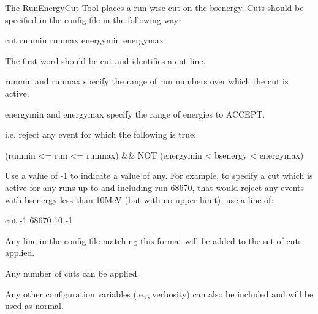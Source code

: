 The Run\+Energy\+Cut Tool places a run-\/wise cut on the bsenergy. Cuts should be specified in the config file in the following way\+: \begin{DoxyVerb}cut runmin runmax energymin energymax
\end{DoxyVerb}

\begin{DoxyItemize}
\item The first word should be \textquotesingle{}cut\textquotesingle{} and identifies a cut line.
\item runmin and runmax specify the range of run numbers over which the cut is active.
\item energymin and energymax specify the range of energies to ACCEPT.
\end{DoxyItemize}

i.\+e. reject any event for which the following is true\+: \begin{DoxyVerb}(runmin <= run <= runmax) && NOT (energymin < bsenergy < energymax)
\end{DoxyVerb}
 Use a value of -\/1 to indicate a value of \textquotesingle{}any\textquotesingle{}. For example, to specify a cut which is active for any runs up to and including run 68670, that would reject any events with bsenergy less than 10MeV (but with no upper limit), use a line of\+: \begin{DoxyVerb}cut -1 68670 10 -1
\end{DoxyVerb}

\begin{DoxyItemize}
\item Any line in the config file matching this format will be added to the set of cuts applied.
\item Any number of cuts can be applied.
\item Any other configuration variables (.e.\+g verbosity) can also be included and will be used as normal. 
\end{DoxyItemize}